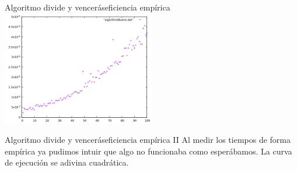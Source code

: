 \documentclass{beamer}
\begin{document}
\begin{frame}{Algoritmo divide y vencerás}{eficiencia empírica}
	\includegraphics[width=0.5\textwidth]{algBueno.png}
\end{frame}
\begin{frame}{Algoritmo divide y vencerás}{eficiencia empírica II}
Al medir los tiempos de forma empírica ya pudimos intuir que algo no funcionaba como esperábamos. La curva de ejecución se adivina cuadrática.
\end{frame}
\end{document}
